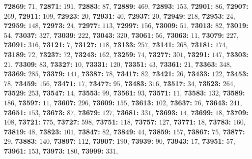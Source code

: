 \textsf{\bfseries 72869:} $71$, \textsf{\bfseries 72871:} $191$, \textsf{\bfseries 72883:} $87$, \textsf{\bfseries 72889:} $469$, \textsf{\bfseries 72893:} $153$, \textsf{\bfseries 72901:} $86$, \textsf{\bfseries 72907:} $269$, \textsf{\bfseries 72911:} $109$, \textsf{\bfseries 72923:} $20$, \textsf{\bfseries 72931:} $40$, \textsf{\bfseries 72937:} $20$, \textsf{\bfseries 72949:} $218$, \textsf{\bfseries 72953:} $24$, \textsf{\bfseries 72959:} $148$, \textsf{\bfseries 72973:} $24$, \textsf{\bfseries 72977:} $113$, \textsf{\bfseries 72997:} $156$, \textsf{\bfseries 73009:} $51$, \textsf{\bfseries 73013:} $82$, \textsf{\bfseries 73019:} $54$, \textsf{\bfseries 73037:} $327$, \textsf{\bfseries 73039:} $222$, \textsf{\bfseries 73043:} $320$, \textsf{\bfseries 73061:} $56$, \textsf{\bfseries 73063:} $11$, \textsf{\bfseries 73079:} $227$, \textsf{\bfseries 73091:} $316$, \textsf{\bfseries 73121:} $7$, \textsf{\bfseries 73127:} $118$, \textsf{\bfseries 73133:} $257$, \textsf{\bfseries 73141:} $268$, \textsf{\bfseries 73181:} $174$, \textsf{\bfseries 73189:} $72$, \textsf{\bfseries 73237:} $72$, \textsf{\bfseries 73243:} $162$, \textsf{\bfseries 73259:} $74$, \textsf{\bfseries 73277:} $301$, \textsf{\bfseries 73291:} $147$, \textsf{\bfseries 73303:} $21$, \textsf{\bfseries 73309:} $83$, \textsf{\bfseries 73327:} $10$, \textsf{\bfseries 73331:} $120$, \textsf{\bfseries 73351:} $43$, \textsf{\bfseries 73361:} $21$, \textsf{\bfseries 73363:} $348$, \textsf{\bfseries 73369:} $285$, \textsf{\bfseries 73379:} $141$, \textsf{\bfseries 73387:} $78$, \textsf{\bfseries 73417:} $82$, \textsf{\bfseries 73421:} $26$, \textsf{\bfseries 73433:} $122$, \textsf{\bfseries 73453:} $78$, \textsf{\bfseries 73459:} $156$, \textsf{\bfseries 73471:} $17$, \textsf{\bfseries 73477:} $95$, \textsf{\bfseries 73483:} $316$, \textsf{\bfseries 73517:} $34$, \textsf{\bfseries 73523:} $264$, \textsf{\bfseries 73529:} $253$, \textsf{\bfseries 73547:} $14$, \textsf{\bfseries 73553:} $99$, \textsf{\bfseries 73561:} $93$, \textsf{\bfseries 73571:} $11$, \textsf{\bfseries 73583:} $132$, \textsf{\bfseries 73589:} $186$, \textsf{\bfseries 73597:} $11$, \textsf{\bfseries 73607:} $296$, \textsf{\bfseries 73609:} $155$, \textsf{\bfseries 73613:} $102$, \textsf{\bfseries 73637:} $76$, \textsf{\bfseries 73643:} $241$, \textsf{\bfseries 73651:} $153$, \textsf{\bfseries 73673:} $87$, \textsf{\bfseries 73679:} $127$, \textsf{\bfseries 73681:} $331$, \textsf{\bfseries 73693:} $14$, \textsf{\bfseries 73699:} $18$, \textsf{\bfseries 73709:} $108$, \textsf{\bfseries 73721:} $775$, \textsf{\bfseries 73727:} $598$, \textsf{\bfseries 73751:} $118$, \textsf{\bfseries 73757:} $127$, \textsf{\bfseries 73771:} $18$, \textsf{\bfseries 73783:} $160$, \textsf{\bfseries 73819:} $48$, \textsf{\bfseries 73823:} $101$, \textsf{\bfseries 73847:} $82$, \textsf{\bfseries 73849:} $44$, \textsf{\bfseries 73859:} $157$, \textsf{\bfseries 73867:} $75$, \textsf{\bfseries 73877:} $29$, \textsf{\bfseries 73883:} $140$, \textsf{\bfseries 73897:} $112$, \textsf{\bfseries 73907:} $190$, \textsf{\bfseries 73939:} $90$, \textsf{\bfseries 73943:} $17$, \textsf{\bfseries 73951:} $57$, \textsf{\bfseries 73961:} $153$, \textsf{\bfseries 73973:} $180$, \textsf{\bfseries 73999:} $331$, 
